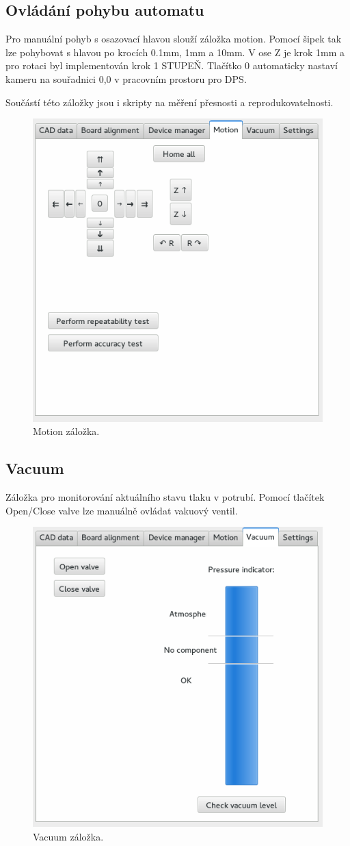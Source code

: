 \subsection{Ovládání pohybu automatu}
Pro manuální pohyb s osazovací hlavou slouží záložka motion. Pomocí šipek tak lze pohybovat s hlavou po krocích 0.1mm, 1mm a 10mm. V ose Z je krok 1mm a pro rotaci byl implementován krok 1 STUPEŇ.
Tlačítko 0 automaticky nastaví kameru na souřadnici 0,0 v pracovním prostoru pro DPS.

Součástí této záložky jsou i skripty na měření přesnosti a reprodukovatelnosti.
\begin{figure}[h!]
  \centering
    \includegraphics[width=0.6\linewidth]{obrazky/sw5.png}%
    \caption{Motion záložka.}
\end{figure}


\subsection{Vacuum}
Záložka pro monitorování aktuálního stavu tlaku v potrubí. Pomocí tlačítek Open/Close valve lze manuálně ovládat vakuový ventil. 
\begin{figure}[h!]
  \centering
    \includegraphics[width=0.6\linewidth]{obrazky/sw6.png}%
    \caption{Vacuum záložka.}
\end{figure}
 
